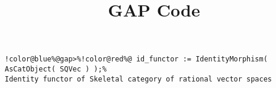 \documentclass[12pt]{amsart}
\title{GAP Code}
\author{}
\begin{document}
\maketitle

\begin{Verbatim}[commandchars=!@\%,frame=single]
!color@blue%@gap>%!color@red%@ id_functor := IdentityMorphism( AsCatObject( SQVec ) );%
Identity functor of Skeletal category of rational vector spaces
\end{Verbatim}
\end{document}
